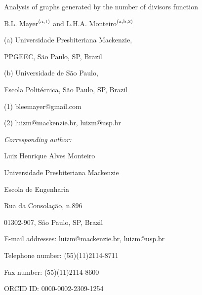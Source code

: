 \documentclass[a4paper,12pt]{article}
\begin{document}
\singlespacing

\newcommand{\cao}{\c{c}\~ao }
\newcommand{\coes}{\c{c}\~oes }
\newcommand{\caO}{\c{c}\~ao}
\newcommand{\coeS}{\c{c}\~oes}
\newcommand{\CAO}{\c{C}\~AO}
\newcommand{\COES}{\c{C}\~OES}
\newcommand{\cc }{\c{c}}
\newcommand{\CC }{\c{C}}
\newcommand{\y }{\'{\i}}
\def\gsim{\raise0.3ex\hbox{$\;>$\kern-0.75em\raise-1.1ex\hbox{$\sim\;$}}}

\def\binom#1#2{{#1\choose#2}}


\vskip 1cm
\begin{center}
{\Large {\bf

Analysis of graphs generated by the number of divisors function
}}

\vskip 0.7cm

{\large {\rm B.L. Mayer$^{\rm{(a,1)}}$ and L.H.A.
Monteiro$^{\rm{(a,b,2)}}$}}


\vskip 0.5cm {\small

(a) Universidade Presbiteriana Mackenzie,

\vskip 0.05cm PPGEEC, S\~ao Paulo, SP, Brazil

\vskip 0.5cm (b)  Universidade de S\~ao Paulo,

\vskip 0.05cm Escola Polit\'ecnica, S\~ao Paulo, SP, Brazil


\vskip 0.5cm

\vskip 0.5cm (1) bleemayer@gmail.com

\vskip 0.1cm (2) luizm@mackenzie.br, luizm@usp.br }

\end{center}

\vskip 2cm

\begin{center}
{\it Corresponding author:}

\vskip 0.05cm Luiz Henrique Alves Monteiro

\vskip 0.05cm Universidade Presbiteriana Mackenzie

\vskip 0.05cm Escola de Engenharia

\vskip 0.05cm Rua da Consola\caO, n.896

\vskip 0.05cm 01302-907, S\~ao Paulo, SP, Brazil

\vskip 0.05cm E-mail addresses: luizm@mackenzie.br, luizm@usp.br

\vskip 0.05cm Telephone number: (55)(11)2114-8711

\vskip 0.05cm Fax number: (55)(11)2114-8600

\vskip 1cm ORCID ID: 0000-0002-2309-1254
\end{center}
\end{document}
